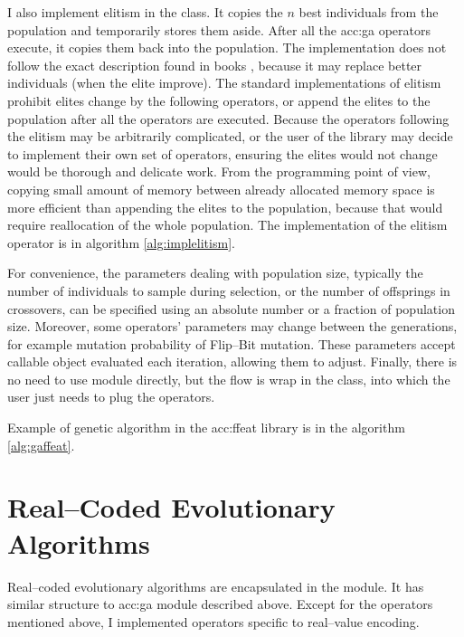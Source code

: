 I also implement elitism in the  class. It copies the $n$ best individuals from the population and temporarily stores them aside. After all the \acrshort{acc:ga} operators execute, it copies them back into the population. The implementation does not follow the exact description found in books \citep{IntroductionToEA}, because it may replace better individuals (when the elite improve). The standard implementations of elitism prohibit elites change by the following operators, or append the elites to the population after all the operators are executed. 
Because the operators following the elitism may be arbitrarily complicated, or the user of the library may decide to implement their own set of operators, ensuring the elites would not change would be thorough and delicate work. %
From the \gpu programming point of view, copying small amount of memory between already allocated memory space is more efficient than appending the elites to the population, because that would require reallocation of the whole population. The implementation of the elitism operator is in algorithm \ref{alg:implelitism}.

For convenience, the parameters dealing with population size, typically the number of individuals to sample during selection, or the number of offsprings in crossovers, can be specified using an absolute number or a fraction of population size. Moreover, some operators' parameters may change between the generations, for example mutation probability of Flip--Bit mutation. These parameters accept callable object evaluated each iteration, allowing them to adjust. Finally, there is no need to use  module directly, but the flow is wrap in the  class, into which the user just needs to plug the operators.

Example of genetic algorithm in the \acrshort{acc:ffeat} library is in the algorithm \ref{alg:gaffeat}.



\section{Real--Coded Evolutionary Algorithms}

Real--coded evolutionary algorithms are encapsulated in the  module. It has similar structure to \acrshort{acc:ga} module described above. Except for the operators mentioned above, I implemented operators specific to real--value encoding.

